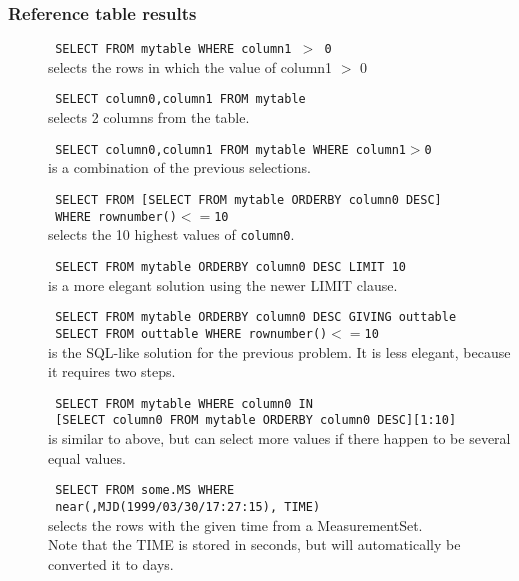 \subsubsection{Reference table results}
\begin{description}
  \item[] \texttt{ SELECT FROM mytable WHERE column1 $>$ 0 }
    \\selects the rows in which the value of column1 $>$ 0

  \item[] \texttt{ SELECT column0,column1 FROM mytable }
    \\selects 2 columns from the table.

  \item[] \texttt{ SELECT column0,column1 FROM mytable WHERE column1$>$0 }
    \\is a combination of the previous selections.

  \item[] \texttt{ SELECT FROM [SELECT FROM mytable ORDERBY column0 DESC] }
    \\\texttt{ WHERE rownumber()$<=$10 }
    \\selects the 10 highest values of \texttt{column0}.

  \item[] \texttt{ SELECT FROM mytable ORDERBY column0 DESC LIMIT 10 }
    \\is a more elegant solution using the newer LIMIT clause.

  \item[] \texttt{ SELECT FROM mytable ORDERBY column0 DESC GIVING outtable }
    \\\texttt{ SELECT FROM outtable WHERE rownumber()$<=$10 }
    \\is the SQL-like solution for the previous problem.
    It is less elegant, because it requires two steps.

  \item[] \texttt{ SELECT FROM mytable WHERE column0 IN }
    \\\texttt{ [SELECT column0 FROM mytable ORDERBY column0 DESC][1:10] }
    \\is similar to above, but can select more values if there happen
    to be several equal values.

  \item[] \texttt{ SELECT FROM some.MS WHERE }
    \\\texttt{ near(,MJD(1999/03/30/17:27:15), TIME) }
    \\selects the rows with the given time from a MeasurementSet.
    \\Note that the TIME is stored in seconds, but will automatically
	be converted it to days.


\end{description}
